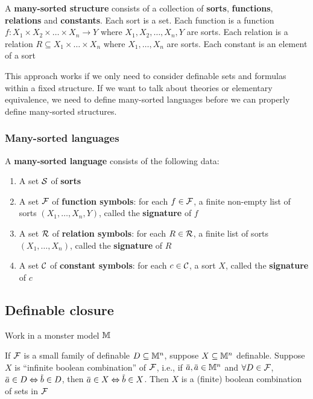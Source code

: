 \documentclass[11pt]{article}
\begin{document}
\begin{definition}[]
A \textbf{many-sorted structure} consists of a collection of \textbf{sorts}, \textbf{functions}, \textbf{relations} and \textbf{constants}.
Each sort is a set. Each function is a function \(f:X_1\times X_2\times\dots\times X_n\to Y\) where \(X_1,X_2,\dots,X_n,Y\)
are sorts. Each relation is a relation \(R\subseteq X_1\times\dots\times X_n\) where \(X_1,\dots,X_n\) are sorts. Each
constant is an element of a sort
\end{definition}

This approach works if we only need to consider definable sets and formulas within a fixed
structure. If we want to talk about theories or elementary equivalence, we need to define
many-sorted languages before we can properly define many-sorted structures.
\subsubsection{Many-sorted languages}
\label{sec:orgd43d456}
\begin{definition}[]
A \textbf{many-sorted language} consists of the following data:
\begin{enumerate}
\item A set \(\mathcal{S}\) of \textbf{sorts}
\item A set \(\mathcal{F}\) of \textbf{function symbols}: for each \(f\in\mathcal{F}\), a finite non-empty list of
sorts \((X_1,\dots,X_n,Y)\), called the \textbf{signature} of \(f\)
\item A set \(\mathcal{R}\) of \textbf{relation symbols}: for each \(R\in\mathcal{R}\), a finite list of sorts \((X_1,\dots,X_n)\),
called the \textbf{signature} of \(R\)
\item A set \(\mathcal{C}\) of \textbf{constant symbols}: for each \(c\in\mathcal{C}\), a sort \(X\), called the \textbf{signature} of \(c\)
\end{enumerate}
\end{definition}

\subsection{Definable closure}
\label{sec:org30ab874}
Work in a monster model \(\mathbb{M}\)

\begin{fact}[]
If \(\mathcal{F}\) is a small family of definable \(D\subseteq\mathbb{M}^n\), suppose \(X\subseteq\mathbb{M}^n\) definable. Suppose \(X\) is
``infinite boolean combination'' of \(\mathcal{F}\), i.e., if \(\bara,\bara\in\M^n\)
and \(\forall D\in\mathcal{F}\), \(\bara\in D\Leftrightarrow\barb\in D\), then \(\bara\in X\Leftrightarrow\barb\in X\). Then \(X\) is a (finite)
boolean combination of sets in \(\mathcal{F}\)
\end{fact}
\end{document}
